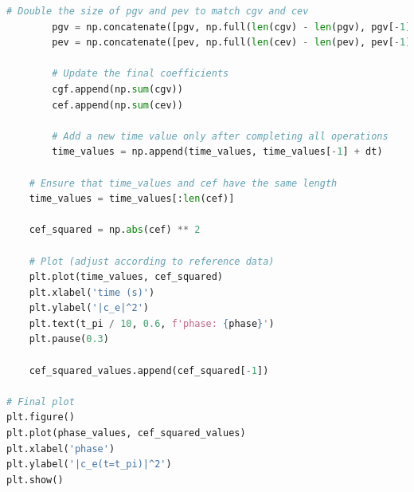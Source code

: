 \documentclass{article}
\begin{document}
\begin{lstlisting}[language=Python, caption=Python code for the simulation of decoherence of the Rabi oscillations in a magnetic gravimeter.]
        # Double the size of pgv and pev to match cgv and cev
        pgv = np.concatenate([pgv, np.full(len(cgv) - len(pgv), pgv[-1])])
        pev = np.concatenate([pev, np.full(len(cev) - len(pev), pev[-1])])

        # Update the final coefficients
        cgf.append(np.sum(cgv))
        cef.append(np.sum(cev))

        # Add a new time value only after completing all operations
        time_values = np.append(time_values, time_values[-1] + dt)

    # Ensure that time_values and cef have the same length
    time_values = time_values[:len(cef)]

    cef_squared = np.abs(cef) ** 2

    # Plot (adjust according to reference data)
    plt.plot(time_values, cef_squared)
    plt.xlabel('time (s)')
    plt.ylabel('|c_e|^2')
    plt.text(t_pi / 10, 0.6, f'phase: {phase}')
    plt.pause(0.3)

    cef_squared_values.append(cef_squared[-1])

# Final plot
plt.figure()
plt.plot(phase_values, cef_squared_values)
plt.xlabel('phase')
plt.ylabel('|c_e(t=t_pi)|^2')
plt.show()
\end{lstlisting}




\end{document}
